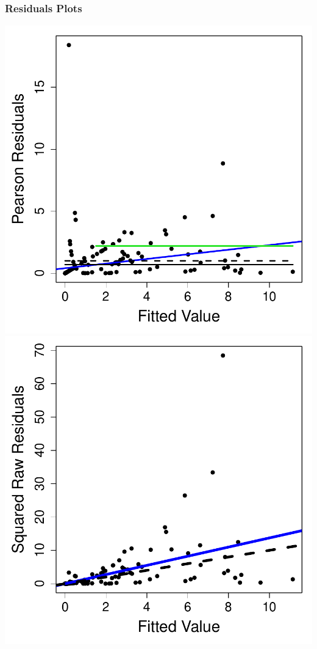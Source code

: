 \documentclass[mathserif,compress]{beamer}\usepackage{graphicx, color}
\makeatletter
\def\maxwidth{ %
  \ifdim\Gin@nat@width>\linewidth
    \linewidth
  \else
    \Gin@nat@width
  \fi
}
\makeatother
\begin{document}
\subsection{}
\begin{frame}[fragile]
\frametitle{Residuals Plots}







	\vspace{-.1cm}
	\begin{center}
	\includegraphics[width = .5\maxwidth]{figure/resids4overdisp-plot}
	\includegraphics[width = .5\maxwidth]{figure/rawresids4overdisp-plot}
	\end{center}

\end{frame}
\end{document}
